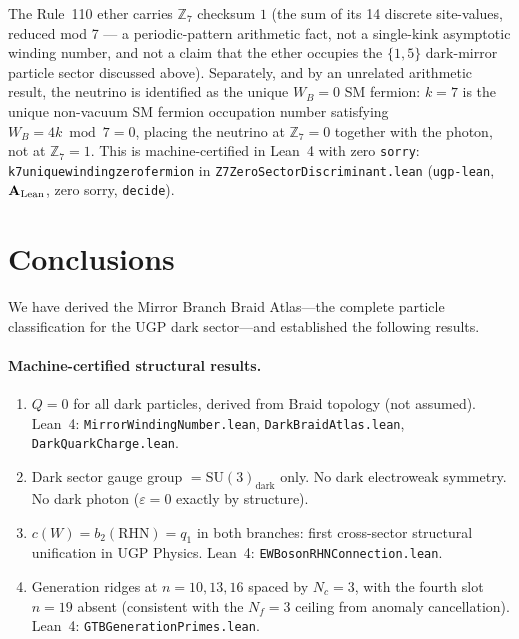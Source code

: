 \documentclass[11pt]{article}
\newcommand{\CatAL}{\ensuremath{\textbf{A}_{\rm Lean}}}
\newcommand{\lean}[1]{%
  \penalty-100
  \begingroup\def\_{\textunderscore\allowbreak}\texttt{#1}\endgroup}
\begin{document}
The Rule~110 ether carries $\mathbb{Z}_7$ checksum $1$ (the sum of its 14 discrete
site-values, reduced mod 7 --- a periodic-pattern arithmetic fact, not a single-kink
asymptotic winding number, and not a claim that the ether occupies the $\{1,5\}$
dark-mirror particle sector discussed above). Separately, and by an unrelated arithmetic
result, the neutrino is identified as the unique $W_B{=}0$ SM fermion: $k = 7$ is the
unique non-vacuum SM fermion occupation number satisfying $W_B = 4k \bmod 7 = 0$, placing
the neutrino at $\mathbb{Z}_7 = 0$ together with the photon, not at $\mathbb{Z}_7=1$.
This is machine-certified in Lean~4 with zero \texttt{sorry}:
\lean{k7\_unique\_winding\_zero\_fermion} in \lean{Z7ZeroSectorDiscriminant.lean}
(\texttt{ugp-lean}, $\CatAL$, zero sorry, \lean{decide}).

\section{Conclusions}
\label{sec:conclusions}

We have derived the Mirror Branch Braid Atlas---the complete particle classification for
the UGP dark sector---and established the following results.

\paragraph{Machine-certified structural results.}
\begin{enumerate}[nosep]
\item $Q=0$ for all dark particles, derived from Braid topology (not assumed). Lean~4:
      \texttt{MirrorWindingNumber.lean}, \texttt{DarkBraidAtlas.lean}, \texttt{DarkQuarkCharge.lean}.
\item Dark sector gauge group $= \mathrm{SU}(3)_\mathrm{dark}$ only. No dark electroweak
      symmetry. No dark photon ($\varepsilon=0$ exactly by structure).
\item $c(W) = b_2(\mathrm{RHN}) = q_1$ in both branches: first cross-sector structural
      unification in UGP Physics. Lean~4: \texttt{EWBosonRHNConnection.lean}.
\item Generation ridges at $n=10, 13, 16$ spaced by $N_c=3$, with the fourth slot $n=19$
      absent (consistent with the $N_f=3$ ceiling from anomaly cancellation). Lean~4:
      \texttt{GTBGenerationPrimes.lean}.
\end{enumerate}
\end{document}
